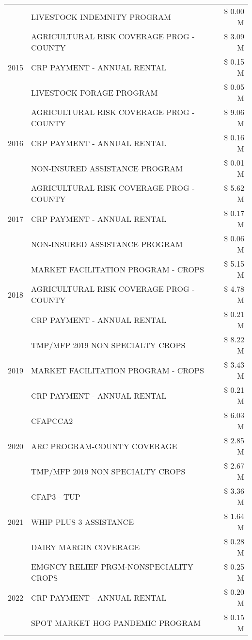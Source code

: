 \begin{tabular}{llr}
 & LIVESTOCK INDEMNITY PROGRAM & \$ 0.00 M \\
\cline{1-3}
\multirow[t]{3}{*}{2015} & AGRICULTURAL RISK COVERAGE PROG - COUNTY & \$ 3.09 M \\
 & CRP PAYMENT - ANNUAL RENTAL & \$ 0.15 M \\
 & LIVESTOCK FORAGE PROGRAM & \$ 0.05 M \\
\cline{1-3}
\multirow[t]{3}{*}{2016} & AGRICULTURAL RISK COVERAGE PROG - COUNTY & \$ 9.06 M \\
 & CRP PAYMENT - ANNUAL RENTAL & \$ 0.16 M \\
 & NON-INSURED ASSISTANCE PROGRAM & \$ 0.01 M \\
\cline{1-3}
\multirow[t]{3}{*}{2017} & AGRICULTURAL RISK COVERAGE PROG - COUNTY & \$ 5.62 M \\
 & CRP PAYMENT - ANNUAL RENTAL & \$ 0.17 M \\
 & NON-INSURED ASSISTANCE PROGRAM & \$ 0.06 M \\
\cline{1-3}
\multirow[t]{3}{*}{2018} & MARKET FACILITATION PROGRAM - CROPS & \$ 5.15 M \\
 & AGRICULTURAL RISK COVERAGE PROG - COUNTY & \$ 4.78 M \\
 & CRP PAYMENT - ANNUAL RENTAL & \$ 0.21 M \\
\cline{1-3}
\multirow[t]{3}{*}{2019} & TMP/MFP 2019 NON SPECIALTY CROPS & \$ 8.22 M \\
 & MARKET FACILITATION PROGRAM - CROPS & \$ 3.43 M \\
 & CRP PAYMENT - ANNUAL RENTAL & \$ 0.21 M \\
\cline{1-3}
\multirow[t]{3}{*}{2020} & CFAPCCA2 & \$ 6.03 M \\
 & ARC PROGRAM-COUNTY COVERAGE & \$ 2.85 M \\
 & TMP/MFP 2019 NON SPECIALTY CROPS & \$ 2.67 M \\
\cline{1-3}
\multirow[t]{3}{*}{2021} & CFAP3 - TUP & \$ 3.36 M \\
 & WHIP PLUS 3 ASSISTANCE & \$ 1.64 M \\
 & DAIRY MARGIN COVERAGE & \$ 0.28 M \\
\cline{1-3}
\multirow[t]{3}{*}{2022} & EMGNCY RELIEF PRGM-NONSPECIALITY CROPS & \$ 0.25 M \\
 & CRP PAYMENT - ANNUAL RENTAL & \$ 0.20 M \\
 & SPOT MARKET HOG PANDEMIC PROGRAM & \$ 0.15 M \\
\cline{1-3}
\bottomrule
\end{tabular}
